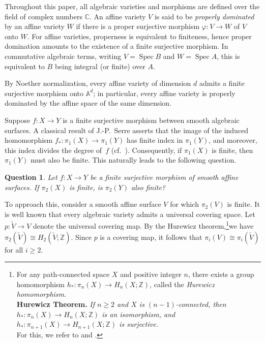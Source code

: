 \documentclass[12pt,reqno,twoside]{amsart}
\newtheorem{question}[theorem]{Question}
\theoremstyle{definition}
\numberwithin{equation}{section}
\newcommand{\C}{\mathbb{C}}
\newcommand{\Z}{\mathbb{Z}}
\newcommand{\Spec}{\operatorname{Spec}}
\begin{document}
\medskip

Throughout this paper, all algebraic varieties and morphisms are defined over the field of complex numbers $\C$. An affine variety $V$ is said to be \emph{properly dominated} by an affine variety $W$ if there is a proper surjective morphism $\varphi: V \to W$ of $V$ onto $W$. For affine varieties, properness is equivalent to finiteness, hence proper domination amounts to the existence of a finite surjective morphism. In commutative algebraic terms, writing $V=\Spec B$ and $W=\Spec A$, this is equivalent to $B$ being integral (or finite) over $A$. 

By Noether normalization, every affine variety of dimension $d$ admits a finite surjective morphism onto $\mathbb{A}^d$; in particular, every affine variety is properly dominated by the affine space of the same dimension.


\medskip

Suppose $f \colon X \to Y$ is a finite surjective morphism between smooth algebraic surfaces. A classical result of J.-P.~Serre asserts that the image of the induced homomorphism 
$f_{\ast} \colon \pi_1(X) \to \pi_1(Y)$ 
has finite index in $\pi_1(Y)$, and moreover, this index divides the degree of~$f$ (cf.~\cite{Ser1959}). Consequently, if $\pi_1(X)$ is finite, then $\pi_1(Y)$ must also be finite. This naturally leads to the following question.

\begin{question}\label{Ques : Basic Ques}
Let $f \colon X \to Y$ be a finite surjective morphism of smooth affine surfaces. If $\pi_2(X)$ is finite, is $\pi_2(Y)$ also finite?
\end{question}

To approach this, consider a smooth affine surface $V$ for which $\pi_2(V)$ is finite. It is well known that every algebraic variety admits a universal covering space. Let $p \colon \widetilde{V} \to V$ denote the universal covering map. By the Hurewicz theorem,\footnote{
For any path-connected space $X$ and positive integer $n$, there exists a group homomorphism 
$h_{*} \colon \pi_{n}(X)\to H_{n}(X;\Z)$, called the \emph{Hurewicz homomorphism}.\\[2mm]
\textbf{Hurewicz Theorem.} \emph{If $n\ge 2$ and $X$ is $(n-1)$-connected, then $h_{*} \colon \pi_{n}(X)\to H_{n}(X;\Z)$ is an isomorphism, and $h_{*}\colon \pi_{n+1}(X)\to H_{n+1}(X;\Z)$ is surjective.} \\[2mm]
For this, we refer to \cite[Chapter 8, Theorem 3]{MT1968} and \cite[Exercise 23, Section 4.2]{Hat2002}.}we have $\pi_2(\widetilde{V}) \cong H_2(\widetilde{V};\Z)$. Since $p$ is a covering map, it follows that $\pi_i(V)\cong \pi_i(\widetilde{V})$ for all $i\ge 2$. 
\end{document}
